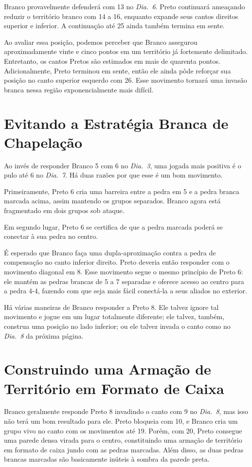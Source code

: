 Branco provavelmente defenderá com 13 no \emph{Dia.\@~6}. Preto continuará ameaçando reduzir o território branco com 14 a 16, enquanto expande seus cantos direitos superior e inferior. A continuação até 25 ainda também termina em sente.

Ao avaliar essa posição, podemos perceber que Branco assegurou aproximadamente vinte e cinco pontos em um território já fortemente delimitado. Entretanto, os cantos Pretos são estimados em mais de quarenta pontos. Adicionalmente, Preto terminou em sente, então ele ainda pôde reforçar sua posição no canto superior esquerdo com 26. Esse movimento tornará uma invasão branca nessa região exponencialmente mais difícil.

\section{Evitando a Estratégia Branca de Chapelação}

Ao invés de responder Branco 5 com 6 no \emph{Dia.\@~3}, uma jogada mais positiva é o pulo até 6 no \emph{Dia.\@~7}. Há duas razões por que esse é um bom movimento.

Primeiramente, Preto 6 cria uma barreira entre a pedra em 5 e a pedra branca marcada acima, assim mantendo os grupos separados. Branco agora está fragmentado em dois grupos sob ataque.

Em segundo lugar, Preto 6 se certifica de que a pedra marcada poderá se conectar à sua pedra no centro.

É esperado que Branco faça uma dupla-aproximação contra a pedra de compensação no canto inferior direito. Preto deveria então responder com o movimento diagonal em 8. Esse movimento segue o mesmo princípio de Preto 6: ele mantém as pedras brancas de 5 a 7 separadas e oferece acesso ao centro para a pedra 4-4, fazendo com que seja mais fácil conectá-la a seus aliados no exterior.

Há várias maneiras de Branco responder a Preto 8. Ele talvez ignore tal movimento e jogue em um lugar totalmente diferente; ele talvez, também, construa uma posição no lado inferior; ou ele talvez invada o canto como no \emph{Dia.\@~8} da próxima página.

\section{Construindo uma Armação de Território em Formato de Caixa}

Branco geralmente responde Preto 8 invadindo o canto com 9 no \emph{Dia.\@~8}, mas isso não terá um bom resultado para ele. Preto bloqueia com 10, e Branco cria um grupo vivo no canto com os movimentos até 19. Porém, com 20, Preto consegue uma parede densa virada para o centro, constituindo uma armação de território em formato de caixa jundo com as pedras marcadas. Além disso, as duas pedras brancas marcadas são basicamente inúteis à sombra da parede preta.

